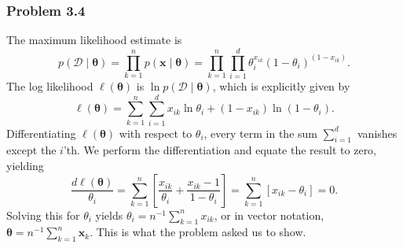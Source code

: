 \documentclass[12pt, a4paper]{article}
\newcommand{\D}{\mathcal{D}}
\newcommand{\vect}[1]{\bm{#1}}
\begin{document}
\subsubsection*{Problem 3.4}
The maximum likelihood estimate is 
\begin{equation*}
	p( \D  \mid  \vect{\theta}) = \prod_{k = 1}^{n} p( \vect{x}  \mid  \vect{\theta}) = \prod_{k = 1}^{n} \prod_{i=1}^{d}
	\theta_{i}^{x_{ik}} \left( 1 - \theta_i \right)^{\left(  1 - x_{ik} \right)}.
\end{equation*}
 The log likelihood $\ell(\vect{\theta})$ is $ \ln p( \D  \mid  \vect{\theta}) $, which is explicitly given by
 \begin{equation*}
 	\ell(\vect{\theta}) = \sum_{k = 1}^{n} \sum_{i=1}^{d}
 	x_{ik} \ln \theta_i + (1 - x_{ik}) \ln \left( 1 - \theta_i\right).
 \end{equation*}
Differentiating $\ell(\vect{\theta})$ with respect to $\theta_i$, every term in the sum $\sum_{i=1}^{d}$ vanishes except the $i$'th.
We perform the differentiation and equate the result to zero, yielding
\begin{equation*}
	\frac{d \ell(\vect{\theta})}{\theta_i} = \sum_{k=1}^{n} \left[ \frac{x_{ik}}{\theta_i} + \frac{x_{ik} - 1}{1 - \theta_i} \right] =
	 \sum_{k=1}^{n} \left[ x_{ik} - \theta_i \right] = 0.
\end{equation*}
Solving this for $\theta_i$ yields $\theta_i = n^{-1} \sum_{k=1}^{n} x_{ik}$, or in vector notation, $\vect{\theta} = n^{-1} \sum_{k=1}^{n} \vect{x}_k$.
This is what the problem asked us to show.
\end{document}
